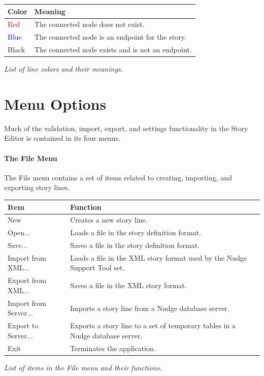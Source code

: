 \documentclass[12pt,letterpaper]{article}
\begin{document}
\begin{center}
    \begin{tabular}{l|p{4in}}
    Color & Meaning\\ \hline \hline
    \textcolor{red}{Red} & The connected node does not exist.\\ \hline
    \textcolor{blue}{Blue} & The connected node is an endpoint for the story.\\ \hline
    Black & The connected node exists and is not an endpoint.\\ \hline
    \end{tabular}
    
    
    \textit{List of line colors and their meanings.}
\end{center}

\section{Menu Options}
Much of the validation, import, export, and settings functionality in the Story Editor is contained in its four menus.

\paragraph{The File Menu}
The File menu contains a set of items related to creating, importing, and exporting story lines.

\begin{center}
    \begin{tabular}{l|p{4in}}
    Item & Function\\ \hline \hline
    New & Creates a new story line.\\ \hline
    Open... & Loads a file in the story definition format.\\ \hline
    Save... & Saves a file in the story definition format.\\ \hline
    Import from XML... & Loads a file in the XML story format used by the Nudge Support Tool set.\\ \hline
    Export from XML... & Saves a file in the XML story format.\\ \hline
    Import from Server... & Imports a story line from a Nudge database server.\\ \hline
    Export to Server... & Exports a story line to a set of temporary tables in a Nudge database server.\\ \hline
    Exit & Terminates the application.\\ \hline
    \end{tabular}
    \textit{List of items in the File menu and their functions.}
\end{center}
\end{document}
